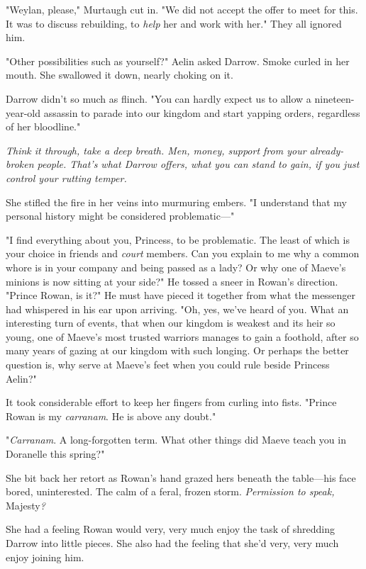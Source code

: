 "Weylan, please," Murtaugh cut in. 
"We did not accept the offer to meet for this. 
It was to discuss rebuilding, to \emph{help} her and work with her." 
They all ignored him.

"Other possibilities such as yourself?" 
Aelin asked Darrow. 
Smoke curled in her mouth. 
She swallowed it down, nearly choking on it.

Darrow didn't so much as flinch. 
"You can hardly expect us to allow a nineteen-year-old assassin to parade into our kingdom and start yapping orders, regardless of her bloodline."

\emph{Think it through, take a deep breath. 
Men, money, support from your already-broken people. 
That's what Darrow offers, what you can stand to gain, if you just control your rutting temper.}

She stifled the fire in her veins into murmuring embers. 
"I understand that my personal history might be considered problematic---"

"I find everything about you, Princess, to be problematic. 
The least of which is your choice in friends and \emph{court} members. 
Can you explain to me why a common whore is in your company and being passed as a lady? 
Or why one of Maeve's minions is now sitting at your side?" 
He tossed a sneer in Rowan's direction. 
"Prince Rowan, is it?"
He must have pieced it together from what the messenger had whispered in his ear upon arriving. 
"Oh, yes, we've heard of you. 
What an interesting turn of events, that when our kingdom is weakest and its heir so young, one of Maeve's most trusted warriors manages to gain a foothold, after so many years of gazing at our kingdom with such longing. 
Or perhaps the better question is, why serve at Maeve's feet when you could rule beside Princess Aelin?"

It took considerable effort to keep her fingers from curling into fists. 
"Prince Rowan is my \emph{carranam}.
He is above any doubt."

"\emph{Carranam}.
A long-forgotten term. 
What other things did Maeve teach you in Doranelle this spring?"

She bit back her retort as Rowan's hand grazed hers beneath the table---his face bored, uninterested. 
The calm of a feral, frozen storm.
\emph{Permission to speak,} Majesty\emph{?}

She had a feeling Rowan would very, very much enjoy the task of shredding Darrow into little pieces. 
She also had the feeling that she'd very, very much enjoy joining him.

